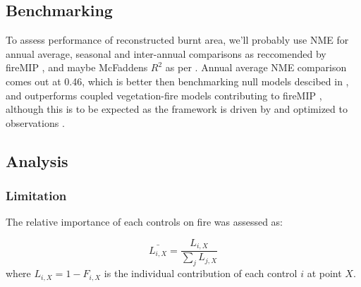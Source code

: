 \subsection{Benchmarking}
\begin{shaded}
To assess performance of reconstructed burnt area, we'll probably use NME for annual average, seasonal and inter-annual comparisons \citep{kelley2013comprehensive} as reccomended by fireMIP \citet{gmd-2016-237, hantson2016status}, and maybe McFaddens $R^{2}$ as per \citep{bistinas2014causal}. Annual average NME comparison comes out at 0.46, which is better then benchmarking null models descibed in \citet{kelley2013comprehensive}, and outperforms coupled vegetation-fire models contributing to fireMIP \citep{hantson2016status}, although this is to be expected as the framework is driven by and optimized to observations \citep{kelley2013comprehensive}.
\end{shaded}
\subsection{Analysis}


\subsubsection{Limitation}

The relative importance of each controls on fire was assessed as:

\begin{equation}
    \bar{L_{i, X}} = \frac{L_{i, X}}{\sum_{j} L_{j, X}}
\end{equation}
where $L_{i, X} = 1 - F_{i,X}$ is the individual contribution of each control $i$ at point $X$.


